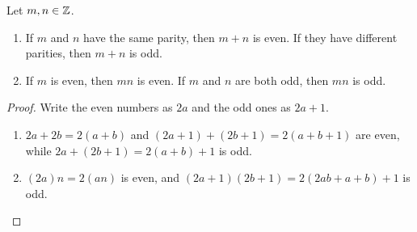\begin{theorem}\label{thm:parity-arithmetic}
  Let $m, n \in \mathbb{Z}$.
  \begin{enumerate}[label=(\alph*)]
    \item If $m$ and $n$ have the same parity, then $m + n$ is even. If they
      have different parities, then $m + n$ is odd.
    \item If $m$ is even, then $mn$ is even. If $m$ and $n$ are both odd,
      then $mn$ is odd.
  \end{enumerate}
\end{theorem}

\begin{proof}
  Write the even numbers as $2a$ and the odd ones as $2a + 1$.
  \begin{enumerate}[label=(\alph*)]
    \item $2a + 2b = 2(a + b)$ and $(2a + 1) + (2b + 1) = 2(a + b + 1)$ are
      even, while $2a + (2b + 1) = 2(a + b) + 1$ is odd.
    \item $(2a)n = 2(an)$ is even, and
      $(2a + 1)(2b + 1) = 2(2ab + a + b) + 1$ is odd. \qedhere
  \end{enumerate}
\end{proof}
